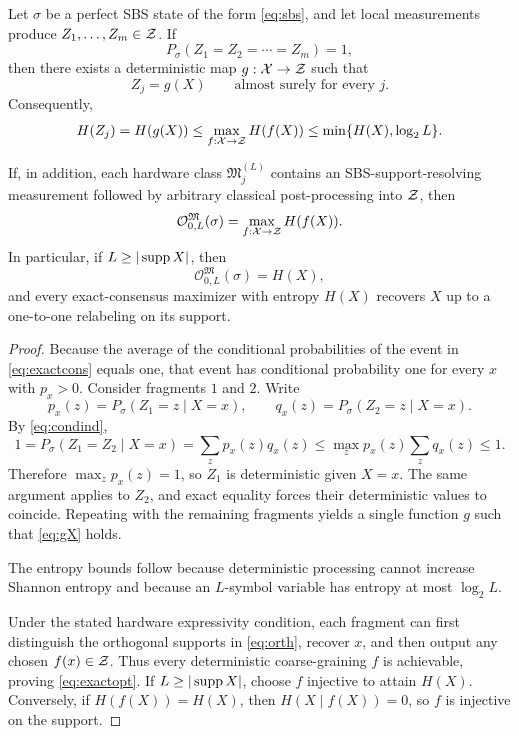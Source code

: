 \begin{theorem}
\label{thm:exact}
Let $\sigma$ be a perfect SBS state of the form \cref{eq:sbs}, and let local measurements produce $Z_1,\ldots,Z_m\in\mathcal{Z}$. If
\begin{equation}
P_\sigma(Z_1=Z_2=\cdots=Z_m)=1,
\label{eq:exactcons}
\end{equation}
then there exists a deterministic map $g:\mathcal{X}\to\mathcal{Z}$ such that
\begin{equation}
Z_j=g(X)\qquad\text{almost surely for every }j.
\label{eq:gX}
\end{equation}
Consequently,
\begin{equation}
H(Z_j)=H(g(X))\le \max_{f:\mathcal{X}\to\mathcal{Z}}H(f(X))\le \min\{H(X),\log_2L\}.
\label{eq:alphabetupper}
\end{equation}

If, in addition, each hardware class $\mathfrak M_j^{(L)}$ contains an SBS-support-resolving measurement followed by arbitrary classical post-processing into $\mathcal{Z}$, then
\begin{equation}
\mathcal O_{0,L}^{\mathfrak M}(\sigma)
=
\max_{f:\mathcal{X}\to\mathcal{Z}}H(f(X)).
\label{eq:exactopt}
\end{equation}
In particular, if $L\ge |\operatorname{supp} X|$, then
\begin{equation}
\mathcal O_{0,L}^{\mathfrak M}(\sigma)=H(X),
\end{equation}
and every exact-consensus maximizer with entropy $H(X)$ recovers $X$ up to a one-to-one relabeling on its support.
\end{theorem}

\begin{proof}
Because the average of the conditional probabilities of the event in \cref{eq:exactcons} equals one, that event has conditional probability one for every $x$ with $p_x>0$. Consider fragments $1$ and $2$. Write
\[
p_x(z)=P_\sigma(Z_1=z\mid X=x),\qquad q_x(z)=P_\sigma(Z_2=z\mid X=x).
\]
By \cref{eq:condind},
\[
1=P_\sigma(Z_1=Z_2\mid X=x)=\sum_z p_x(z)q_x(z)
\le \max_z p_x(z)\sum_zq_x(z)\le1.
\]
Therefore $\max_zp_x(z)=1$, so $Z_1$ is deterministic given $X=x$. The same argument applies to $Z_2$, and exact equality forces their deterministic values to coincide. Repeating with the remaining fragments yields a single function $g$ such that \cref{eq:gX} holds.

The entropy bounds follow because deterministic processing cannot increase Shannon entropy and because an $L$-symbol variable has entropy at most $\log_2L$.

Under the stated hardware expressivity condition, each fragment can first distinguish the orthogonal supports in \cref{eq:orth}, recover $x$, and then output any chosen $f(x)\in\mathcal{Z}$. Thus every deterministic coarse-graining $f$ is achievable, proving \cref{eq:exactopt}. If $L\ge|\operatorname{supp} X|$, choose $f$ injective to attain $H(X)$. Conversely, if $H(f(X))=H(X)$, then $H(X\mid f(X))=0$, so $f$ is injective on the support.
\end{proof}

